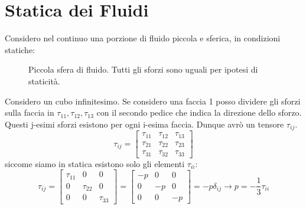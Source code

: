 \section{Statica dei Fluidi}
Considero nel continuo una porzione di fluido piccola e sferica, in condizioni statiche:
\begin{figure}[H]
  \centering
  \caption{Piccola sfera di fluido. Tutti gli sforzi sono uguali per ipotesi di staticità.}
  \label{fig:flux_sfera}
\end{figure}
Considero un cubo infinitesimo.
Se considero una faccia 1 posso dividere gli sforzi sulla faccia in $ \tau_{11},\tau_{12},\tau_{13} $ con il secondo pedice che indica la direzione dello sforzo. Questi j-esimi sforzi esistono per ogni i-esima faccia. Dunque avrò un tensore $ \tau_{ij} $.
\begin{equation}
  \label{eq:tens_generico}
  \tau_{ij} =
  \begin{bmatrix}
    \tau_{11} & \tau_{12} & \tau_{13} \\
    \tau_{21} & \tau_{22} & \tau_{23}\\
    \tau_{31} & \tau_{32} & \tau_{33}
  \end{bmatrix}
\end{equation}
siccome siamo in statica esistono solo gli elementi $ \tau_{ii} $:
\begin{equation}
  \label{eq:tens_statico}
  \tau_{ij} =
  \begin{bmatrix}
    \tau_{11} & 0 & 0\\
    0 & \tau_{22} & 0\\
    0 & 0 & \tau_{33}
  \end{bmatrix} =
  \begin{bmatrix}
    -p & 0 & 0\\
    0 & -p & 0\\
    0 & 0 & -p
  \end{bmatrix}
  = -p \delta_{ij}\to p = -\frac{1}{3}\tau_{ii}
\end{equation}
